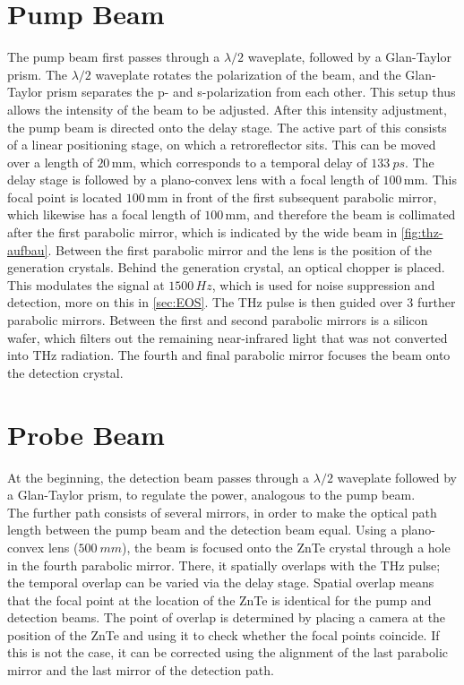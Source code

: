 \section{Pump Beam}
\label{sec:pump}
The pump beam first passes through a $\lambda/2$ waveplate, followed by a Glan-Taylor prism.
The $\lambda/2$ waveplate rotates the polarization of the beam, and the Glan-Taylor prism
separates the p- and s-polarization from each other.
This setup thus allows the intensity of the beam to be adjusted.
After this intensity adjustment, the pump beam is directed onto the delay stage.
The active part of this consists of a linear positioning stage, on which a retroreflector sits.
This can be moved over a length of $20\,\unit{\milli\meter}$, which corresponds to a temporal
delay of $\SI{133}{ps}$.
The delay stage is followed by a plano-convex lens with a focal length of
$100\,\unit{\milli\meter}$.
This focal point is located $100\,\unit{\milli\meter}$ in front of the first subsequent parabolic
mirror, which likewise has a focal length of $100\,\unit{\milli\meter}$, and therefore the beam
is collimated after the first parabolic mirror, which is indicated by the wide beam in
\autoref{fig:thz-aufbau}.
Between the first parabolic mirror and the lens is the position of the generation crystals.
Behind the generation crystal, an optical chopper is placed. This modulates the signal at
$1500\,\unit{Hz}$, which is used for noise suppression and detection, more on this in
\autoref{sec:EOS}.
The THz pulse is then guided over 3 further parabolic mirrors.
Between the first and second parabolic mirrors is a silicon wafer, which filters out the
remaining near-infrared light that was not converted into THz radiation.
The fourth and final parabolic mirror focuses the beam onto the detection crystal.



\section{Probe Beam}
\label{sec:probe}


At the beginning, the detection beam passes through a $\lambda/2$ waveplate followed by a
Glan-Taylor prism, to regulate the power, analogous to the pump beam. \\
The further path consists of several mirrors, in order to make the optical path length between
the pump beam and the detection beam equal.
Using a plano-convex lens ($\SI{500}{mm}$), the beam is focused onto the ZnTe crystal through a
hole in the fourth parabolic mirror.
There, it spatially overlaps with the THz pulse; the temporal overlap can be varied via the delay
stage.
Spatial overlap means that the focal point at the location of the ZnTe is identical for the pump
and detection beams.
The point of overlap is determined by placing a camera at the position of the ZnTe and using it
to check whether the focal points coincide. If this is not the case, it can be corrected using
the alignment of the last parabolic mirror and the last mirror of the detection path.


